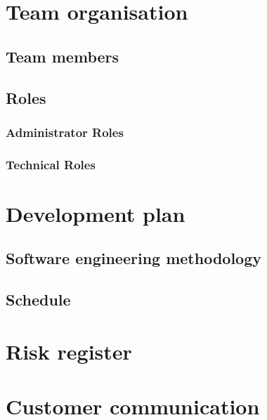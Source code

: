 \documentclass[10pt,a4paper]{article}
\begin{document}
\section{Team organisation}

\subsection{Team members}

\subsection{Roles}
\subsubsection{Administrator Roles} 


\subsubsection{Technical Roles}


\section{Development plan}

\subsection{Software engineering methodology}

\subsection{Schedule}


\section{Risk register}


\section{Customer communication}
\end{document}
